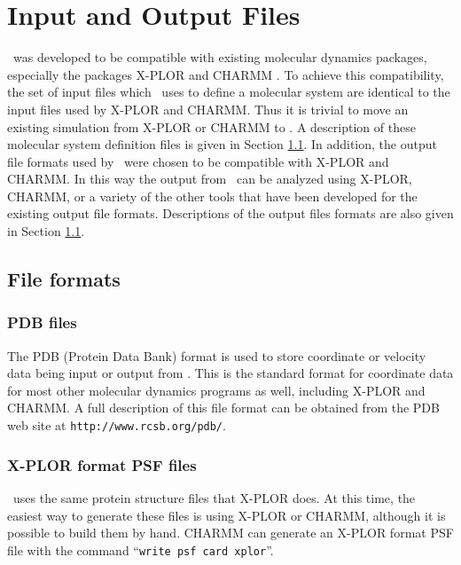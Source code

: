 
\section{Input and Output Files}
\label{section:files}

\NAMD\ was developed to be compatible with existing 
molecular dynamics packages, 
especially the packages X-PLOR 
and CHARMM .  
To achieve this compatibility,
the set of input files which \NAMD\ uses to define 
a molecular system are identical to the input files used by X-PLOR and CHARMM.  
Thus it is trivial to move an existing simulation from
X-PLOR or CHARMM to \NAMD.
A description of these molecular system definition 
files is given in Section \ref{section:formats}.  
\prettypar
In addition, the output file formats used by \NAMD\ 
were chosen to be compatible with X-PLOR and CHARMM.  
In this way the output from \NAMD\ can be analyzed using
X-PLOR, CHARMM, or a variety of the other tools that have 
been developed for the existing output file formats.  
Descriptions of the output files formats are also given in 
Section \ref{section:formats}.


\subsection{File formats}
\label{section:formats}

\subsubsection{PDB files}
The PDB (Protein Data Bank) format is used to store coordinate or velocity data 
being input or output from \NAMD.
This is the standard format for coordinate data
for most other molecular dynamics programs as well, including X-PLOR and CHARMM.
A full description of this file format can be obtained from the PDB web site
at {\tt http://www.rcsb.org/pdb/}.

\subsubsection{X-PLOR format PSF files}

\NAMD\ uses the same protein structure files that X-PLOR does.
At this time, the
easiest way to generate these files is using X-PLOR or CHARMM,
although it is possible to build them by hand.
CHARMM can generate an X-PLOR format PSF file with the command
``{\tt write psf card xplor}''.


